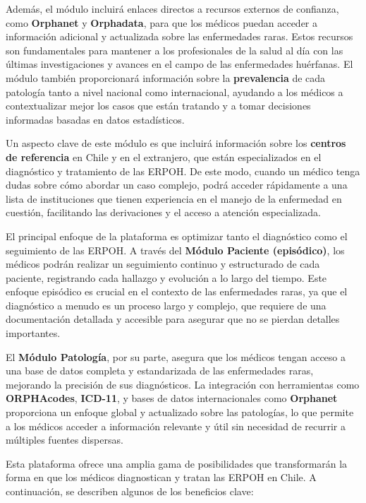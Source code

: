 \documentclass{article}
\begin{document}
\begin{enumerate}[leftmargin=1.2em]
  Además, el módulo incluirá enlaces directos a recursos externos de confianza, como \textbf{Orphanet} y \textbf{Orphadata}, para que los médicos puedan acceder a información adicional y actualizada sobre las enfermedades raras. Estos recursos son fundamentales para mantener a los profesionales de la salud al día con las últimas investigaciones y avances en el campo de las enfermedades huérfanas. El módulo también proporcionará información sobre la \textbf{prevalencia} de cada patología tanto a nivel nacional como internacional, ayudando a los médicos a contextualizar mejor los casos que están tratando y a tomar decisiones informadas basadas en datos estadísticos.

  Un aspecto clave de este módulo es que incluirá información sobre los \textbf{centros de referencia} en Chile y en el extranjero, que están especializados en el diagnóstico y tratamiento de las ERPOH. De este modo, cuando un médico tenga dudas sobre cómo abordar un caso complejo, podrá acceder rápidamente a una lista de instituciones que tienen experiencia en el manejo de la enfermedad en cuestión, facilitando las derivaciones y el acceso a atención especializada.

\end{enumerate}


El principal enfoque de la plataforma es optimizar tanto el diagnóstico como el seguimiento de las ERPOH. A través del \textbf{Módulo Paciente (episódico)}, los médicos podrán realizar un seguimiento continuo y estructurado de cada paciente, registrando cada hallazgo y evolución a lo largo del tiempo. Este enfoque episódico es crucial en el contexto de las enfermedades raras, ya que el diagnóstico a menudo es un proceso largo y complejo, que requiere de una documentación detallada y accesible para asegurar que no se pierdan detalles importantes. 

El \textbf{Módulo Patología}, por su parte, asegura que los médicos tengan acceso a una base de datos completa y estandarizada de las enfermedades raras, mejorando la precisión de sus diagnósticos. La integración con herramientas como \textbf{ORPHAcodes}, \textbf{ICD-11}, y bases de datos internacionales como \textbf{Orphanet} proporciona un enfoque global y actualizado sobre las patologías, lo que permite a los médicos acceder a información relevante y útil sin necesidad de recurrir a múltiples fuentes dispersas. 


Esta plataforma ofrece una amplia gama de posibilidades que transformarán la forma en que los médicos diagnostican y tratan las ERPOH en Chile. A continuación, se describen algunos de los beneficios clave:
\end{document}
